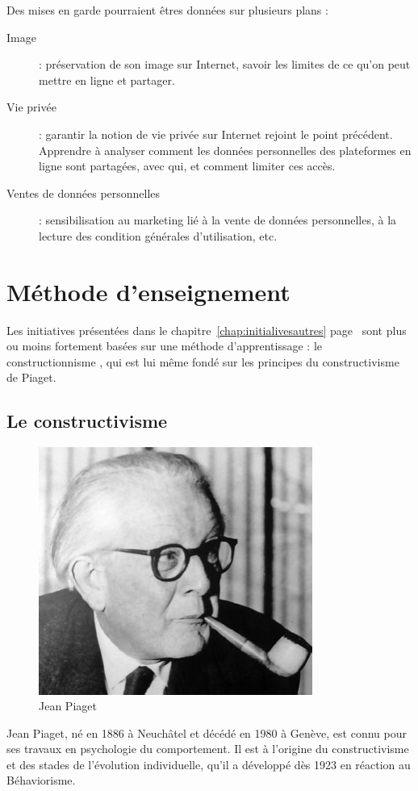 Des mises en garde pourraient êtres données sur plusieurs plans :

\begin{description}
  \item[Image] : préservation de son image sur Internet, savoir les limites de ce qu'on peut mettre en ligne et partager.
  \item[Vie privée] : garantir la notion de vie privée sur Internet rejoint le point précédent. Apprendre à analyser comment les données personnelles des plateformes en ligne sont partagées, avec qui, et comment limiter ces accès.
  \item[Ventes de données personnelles] : sensibilisation au marketing lié à la vente de données personnelles, à la lecture des condition générales d'utilisation, etc.
\end{description}

\section{Méthode d'enseignement}

Les initiatives présentées dans le chapitre~\ref{chap:initialivesautres} page~\pageref{chap:initialivesautres} sont plus ou moins fortement basées sur une méthode d'apprentissage : le \og constructionnisme \fg{}, qui est lui même fondé sur les principes du constructivisme de Piaget.

\subsection{Le constructivisme}
\begin{minipage}[H]{0.3\linewidth}
  \begin{figure}[H]
  \centering
  \includegraphics[width=0.8\textwidth]{../resources/illustrations/piaget}
  \caption{Jean Piaget}
  \end{figure}
\end{minipage}
\begin{minipage}[H]{0.7\linewidth}
Jean Piaget, né en 1886 à Neuchâtel et décédé en 1980 à Genève, est connu pour ses travaux en psychologie du comportement. Il est à l'origine du constructivisme et des stades de l'évolution individuelle, qu'il a développé dès 1923 en réaction au Béhaviorisme.
\end{minipage}

